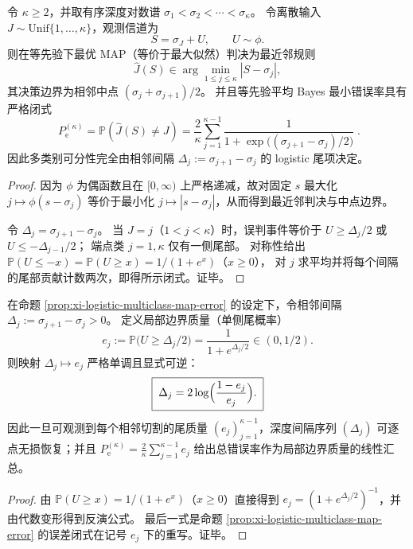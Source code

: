 \begin{proposition}\label{prop:xi-logistic-multiclass-map-error}
令 \(\kappa\ge 2\)，并取有序深度对数谱
\(
\sigma_1<\sigma_2<\cdots<\sigma_\kappa
\)。
令离散输入 \(J\sim\mathrm{Unif}\{1,\dots,\kappa\}\)，观测信道为
\[
S=\sigma_J+U,
\qquad
U\sim\phi.
\]
则在等先验下最优 MAP（等价于最大似然）判决为最近邻规则
\[
\widehat J(S)\in\arg\min_{1\le j\le\kappa}|S-\sigma_j|,
\]
其决策边界为相邻中点 \((\sigma_j+\sigma_{j+1})/2\)。
并且等先验平均 Bayes 最小错误率具有严格闭式
\[
\boxed{\;
P_{\mathrm e}^{(\kappa)}
=\mathbb P(\widehat J(S)\neq J)
=\frac{2}{\kappa}\sum_{j=1}^{\kappa-1}\frac{1}{1+\exp\!\bigl((\sigma_{j+1}-\sigma_j)/2\bigr)}\; }.
\]
因此多类别可分性完全由相邻间隔 \(\Delta_j:=\sigma_{j+1}-\sigma_j\) 的 logistic 尾项决定。
\end{proposition}
\begin{proof}
因为 \(\phi\) 为偶函数且在 \([0,\infty)\) 上严格递减，故对固定 \(s\) 最大化 \(j\mapsto \phi(s-\sigma_j)\) 等价于最小化 \(j\mapsto |s-\sigma_j|\)，从而得到最近邻判决与中点边界。
\par
令 \(\Delta_j=\sigma_{j+1}-\sigma_j\)。
当 \(J=j\)（\(1<j<\kappa\)）时，误判事件等价于
\(
U\ge \Delta_j/2
\)
或
\(
U\le -\Delta_{j-1}/2
\)；
端点类 \(j=1,\kappa\) 仅有一侧尾部。
对称性给出
\(
\mathbb P(U\le -x)=\mathbb P(U\ge x)=1/(1+e^{x})
\)（\(x\ge 0\)），
对 \(j\) 求平均并将每个间隔的尾部贡献计数两次，即得所示闭式。证毕。
\end{proof}


\begin{corollary}\label{cor:xi-logistic-boundary-mass-inverts-spacing}
在命题 \ref{prop:xi-logistic-multiclass-map-error} 的设定下，令相邻间隔 \(\Delta_j:=\sigma_{j+1}-\sigma_j>0\)。
定义局部边界质量（单侧尾概率）
\[
e_j:=\mathbb P\bigl(U\ge \Delta_j/2\bigr)=\frac{1}{1+e^{\Delta_j/2}}\in(0,1/2).
\]
则映射 \(\Delta_j\mapsto e_j\) 严格单调且显式可逆：
\[
\boxed{\;
\Delta_j=2\log\Bigl(\frac{1-e_j}{e_j}\Bigr).\;}
\]
因此一旦可观测到每个相邻切割的尾质量 \((e_j)_{j=1}^{\kappa-1}\)，深度间隔序列 \((\Delta_j)\) 可逐点无损恢复；并且
\(
P_{\mathrm e}^{(\kappa)}=\frac{2}{\kappa}\sum_{j=1}^{\kappa-1}e_j
\)
给出总错误率作为局部边界质量的线性汇总。
\end{corollary}
\begin{proof}
由 \(\mathbb P(U\ge x)=1/(1+e^{x})\)（\(x\ge 0\)）直接得到 \(e_j=(1+e^{\Delta_j/2})^{-1}\)，并由代数变形得到反演公式。
最后一式是命题 \ref{prop:xi-logistic-multiclass-map-error} 的误差闭式在记号 \(e_j\) 下的重写。证毕。
\end{proof}

